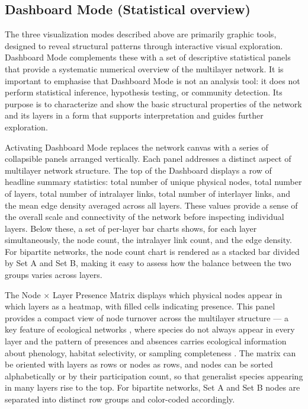 \documentclass{article}
\begin{document}
\subsection{Dashboard Mode (Statistical overview)}

The three visualization modes described above are primarily graphic tools, designed to reveal structural patterns through interactive visual exploration. Dashboard Mode complements these with a set of descriptive statistical panels that provide a systematic numerical overview of the multilayer network. It is important to emphasise that Dashboard Mode is not an analysis tool: it does not perform statistical inference, hypothesis testing, or community detection. Its purpose is to characterize and show the basic structural properties of the network and its layers in a form that supports interpretation and guides further exploration.

Activating Dashboard Mode replaces the network canvas with a series of collapsible panels arranged vertically. Each panel addresses a distinct aspect of multilayer network structure. The top of the Dashboard displays a row of headline summary statistics: total number of unique physical nodes,  total number of layers,  total number of intralayer links, total number of interlayer links, and the mean edge density averaged across all layers. These values provide a sense of the overall scale and connectivity of the network before inspecting individual layers. Below these, a set of per-layer bar charts shows, for each layer simultaneously, the node count, the intralayer link count, and the edge density. For bipartite networks, the node count chart is rendered as a stacked bar divided by Set A and Set B, making it easy to assess how the balance between the two groups varies across layers.

The Node $\times$ Layer Presence Matrix displays which physical nodes appear in which layers as a heatmap, with filled cells indicating presence. This panel provides a compact view of node turnover across the multilayer structure — a key feature of ecological networks \cite{Pilosof2017-gq}, where species do not always appear in every layer and the pattern of presences and absences carries ecological information about phenology, habitat selectivity, or sampling completeness \cite{Poisot2012-hz}. The matrix can be oriented with layers as rows or nodes as rows, and nodes can be sorted alphabetically or by their participation count, so that generalist species appearing in many layers rise to the top. For bipartite networks, Set A and Set B nodes are separated into distinct row groups and color-coded accordingly.
\end{document}
